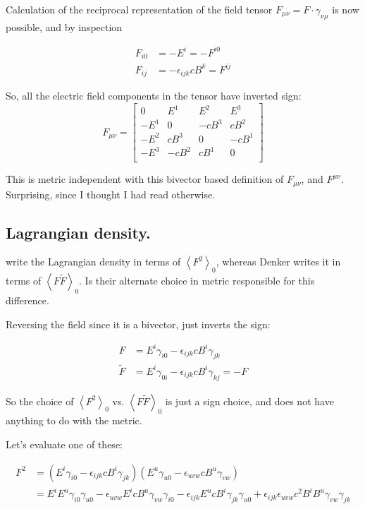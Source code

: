 \documentclass{article}
\newcommand{\gpgrade}[2] {{\left\langle{{#1}}\right\rangle}_{#2}}
\newcommand{\gpgradezero}[1] {\gpgrade{#1}{0}}
\begin{document}

Calculation of the reciprocal representation of the field tensor $F_{{\mu} {\nu}} = F \cdot \gamma_{\nu\mu}$ is now possible, and by inspection

\begin{align*}
F_{i0} &= -E^i = -F^{i0} \\
F_{ij} &= - \epsilon_{i j k} c B^k = F^{ij}
\end{align*}

So, all the electric field components in the tensor have inverted sign:
\begin{equation*}
F_{\mu\nu} =
\begin{bmatrix}
0   & E^1 & E^2 & E^3 \\
-E^1 &   0  & -c B^3 &  c B^2 \\
-E^2 &  c B^3 &   0  & -c B^1 \\
-E^3 & -c B^2 &  c B^1 &   0  \\
\end{bmatrix}
\end{equation*}

This is metric independent with this bivector based definition of $F_{\mu\nu}$, and $F^{\mu\nu}$.  Surprising, since I thought I had read otherwise.

\subsection{ Lagrangian density. }

\cite{doran2003gap}
write the Lagrangian density in terms of $\gpgradezero{F^2}$, whereas Denker writes it in terms of $\gpgradezero{F \tilde{F}}$.  Is their
alternate choice in metric responsible for this difference.

Reversing the field since it is a bivector, just inverts the sign:

\begin{align*}
F &= E^i \gamma_{i 0} - \epsilon_{i j k} c B^i \gamma_{j k} \\
\tilde{F} &= E^i \gamma_{0 i} - \epsilon_{i j k} c B^i \gamma_{k j} = -F
\end{align*}

So the choice of $\gpgradezero{F^2}$ vs. $\gpgradezero{F \tilde{F}}$ is just a sign choice, and does not have anything to do with the metric.

Let's evaluate one of these:

\begin{align*}
F^2
&=
(E^i \gamma_{i 0} - \epsilon_{i j k} c B^i \gamma_{j k}) (E^u \gamma_{u 0} - \epsilon_{u v w} c B^u \gamma_{v w})  \\
&=
E^i E^u \gamma_{i 0} \gamma_{u 0}
- \epsilon_{u v w} E^i c B^u \gamma_{v w} \gamma_{i 0}
- \epsilon_{i j k} E^u c B^i \gamma_{j k} \gamma_{u 0}
+ \epsilon_{i j k} \epsilon_{u v w} c^2 B^i B^u \gamma_{v w} \gamma_{j k}
\\
\end{align*}
\end{document}
